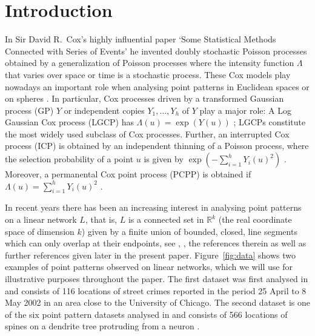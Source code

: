 \documentclass[alpha-refs]{wiley-article}
\begin{document}
\section{Introduction}\label{s:intro}

In Sir David R.\ Cox's highly influential paper `Some Statistical Methods Connected with Series of Events' \citep{Cox55} he invented  
doubly stochastic Poisson processes obtained by a generalization of Poisson processes where the intensity function $\Lambda$ that varies over space or time is a stochastic process. %
These Cox models play nowadays an important role when analysing point patterns in Euclidean spaces or on  spheres \citep[see][and the references therein]{MW04,LawrenceEtAl}.
In particular, Cox processes driven by a transformed Gaussian process (GP) $Y$ or independent copies $Y_1,\ldots,Y_h$ of $Y$
play a major role: A Log Gaussian Cox process (LGCP) has $\Lambda(u)=\exp(Y(u))$ \citep{LGCP,CM}; LGCPs constitute the most widely used subclass of Cox processes. Further, an interrupted Cox process (ICP) is obtained by an independent thinning of a Poisson process, where the selection probability of a point $u$ is given by  $\exp(-\sum_{i=1}^hY_i(u)^2)$ \citep[][]{Stoyan,FredMe}. Moreover, a permanental Cox point process (PCPP) is obtained if $\Lambda(u)=\sum_{i=1}^hY_i(u)^2$ \citep{Macchi:75,MacCM}.

In recent years there has been an increasing interest in analysing point patterns on a linear network $L$, that is, $L$ is a connected set in $\mathbb R^k$ (the real coordinate space of dimension $k$) given by a finite union of bounded, closed, line segments  
which can only overlap at their endpoints, see
\citet{AngEtAl}, \citet{spatstat}, the references therein as well as further references given later in the present paper.
Figure~\ref{fig:data} shows two examples of point patterns observed on linear networks, which we will use for illustrative purposes throughout the paper.
The first dataset was first analysed in \citet{AngEtAl} and consists of 116 locations of street crimes reported in the period 25 April to 8 May 2002 in an area close to the University of Chicago. 
The second dataset is 
one 
of the six point pattern datasets analysed in \citet{HeidiMe}  and 
consists of 566 locations of spines on a dendrite tree protruding from a neuron \citep[see also][]{RasmussenChristensen}.
 
\end{document}
